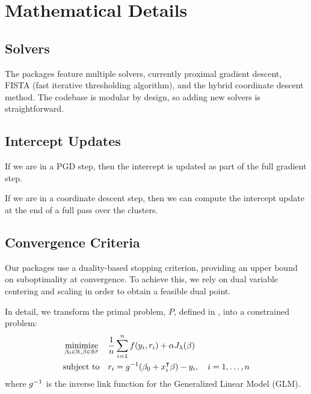\documentclass[article]{jss}
\let\Cref\crtCref
\begin{document}
\section{Mathematical Details}

\subsection{Solvers}

The packages feature multiple solvers, currently proximal gradient descent,
FISTA (fast iterative thresholding algorithm), and the hybrid
coordinate descent method. The codebase is modular by design, so
adding new solvers is straightforward.

\subsection{Intercept Updates}

If we are in a PGD step, then the intercept is updated as part of the
full gradient step.

If we are in a coordinate descent step, then we can compute the intercept
update at the end of a full pass over the clusters.

\subsection{Convergence Criteria}

Our packages use a duality-based stopping criterion, providing an upper
bound on suboptimality at convergence. To achieve this, we rely
on dual variable centering and scaling in order to obtain a feasible dual
point.

In detail, we transform the primal problem, \(P\), defined in \Cref{eq:slope}, into a
constrained problem:
\begin{equation}
  \label{eq:slope-constrained}
  \begin{aligned}
     & \operatorname*{minimize}_{\beta_0 \in \mathbb{R},\beta \in \mathbb{R}^p} &  & \frac{1}{n} \sum_{i=1}^n f(y_i, r_i) + \alpha J_{\lambda}(\beta)          \\
     & \text{subject to}                                         &  & r_i = g^{-1}(\beta_0 + x_i^\intercal \beta) - y_i, \quad i = 1, \ldots, n \\
  \end{aligned}
\end{equation}
where \(g^{-1}\) is the inverse link function for the Generalized Linear Model (GLM).
\end{document}
